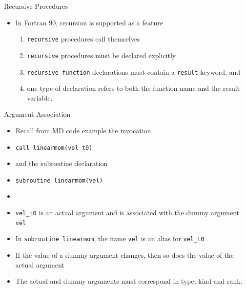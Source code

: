 \documentclass[c,mathserif,compress,xcolor=svgnames]{beamer}
\newcommand{\lstfortran}[1]{\lstinline[language={[90]Fortran},basicstyle=\footnotesize\ttfamily]|#1|}
\begin{document}
\begin{frame}[fragile]{Recursive Procedures}
  \begin{itemize}
    \item In Fortran 90, recursion is supported as a feature
    \begin{enumerate}
      \item \lstfortran{recursive} procedures call themselves
      \item \lstfortran{recursive} procedures must be declared explicitly
      \item \lstfortran{recursive function} declarations must contain a \lstfortran{result} keyword, and 
      \item one type of declaration refers to both the function name and the result variable.
    \end{enumerate}
  \end{itemize}    
  \begin{columns}[t]
    \column{6cm}
      Fortran},basicstyle=\fontsize{4.5}{5}\selectfont\ttfamily]{./Exercise/factorial.f90}
    \column{5cm}
      \begin{Verbatim}[fontsize=\fontsize{4.5}{5}\selectfont,formatcom=\color{indigo}]
[apacheco@qb4 Exercise] ./factorial
 enter integer whose factorial you want to calculate
10 
   10! =              3628800
[apacheco@qb4 Exercise] ./fact1
 Enter an integer < 15
10
  10!=        3628800
        \end{Verbatim}
    \end{columns}
\end{frame}

\begin{frame}[fragile]{Argument Association}
  \begin{itemize}
    \item Recall from MD code example the invocation
    \item[] \lstfortran{call linearmom(vel_t0)}
    \item and the subroutine declaration
    \item[] \lstfortran{subroutine linearmom(vel)}
    \item[]
    \item {\lstfortran{vel_t0}} is an actual argument and is associated with the dummy argument {\lstfortran{vel}}
    \item In {\lstfortran{subroutine linearmom}}, the name {\lstfortran{vel}} is an alias for {\lstfortran{vel_t0}}
    \item If the value of a dummy argument changes, then so does the value of the actual argument
    \item {\color{red}The actual and dummy arguments must correspond in type, kind and rank.}
  \end{itemize}
\end{frame}
\end{document}
